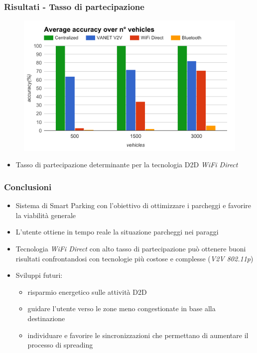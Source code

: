 \documentclass{beamer}
\begin{document}
\begin{frame}
  \frametitle{Risultati - Tasso di partecipazione}

      \begin{figure}
      \includegraphics[scale=0.4]{img/graphics/n_car.png}
      \end{figure}
      \begin{itemize}
	\item  Tasso di partecipazione determinante per la tecnologia D2D \textit{WiFi Direct}
      \end{itemize}
 
\end{frame}


\begin{frame}
\frametitle{Conclusioni}
  \begin{itemize}
    \item Sistema di Smart Parking con l'obiettivo di ottimizzare i parcheggi e favorire la viabilità generale
    \item L'utente ottiene in tempo reale la situazione parcheggi nei paraggi
    \item Tecnologia \textit{WiFi Direct} con alto tasso di partecipazione può ottenere buoni risultati confrontandosi con tecnologie più costose e complesse (\textit{V2V 802.11p})
    \item Sviluppi futuri: 
      \begin{itemize}
	\item risparmio energetico sulle attività D2D
	\item guidare l'utente verso le zone meno congestionate in base alla destinazione
	\item individuare e favorire le sincronizzazioni che permettano di aumentare il processo di spreading
      \end{itemize}
  \end{itemize}
\end{frame}
\end{document}
